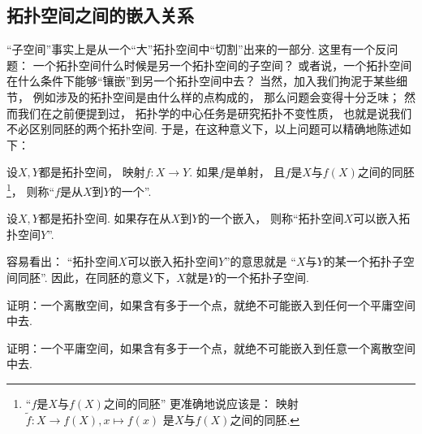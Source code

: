 \subsection{拓扑空间之间的嵌入关系}
“子空间”事实上是从一个“大”拓扑空间中“切割”出来的一部分.
这里有一个反问题：
一个拓扑空间什么时候是另一个拓扑空间的子空间？
或者说，一个拓扑空间在什么条件下能够“镶嵌”到另一个拓扑空间中去？
当然，加入我们拘泥于某些细节，
例如涉及的拓扑空间是由什么样的点构成的，
那么问题会变得十分乏味；
然而我们在之前便提到过，
拓扑学的中心任务是研究拓扑不变性质，
也就是说我们不必区别同胚的两个拓扑空间.
于是，在这种意义下，以上问题可以精确地陈述如下：
\begin{definition}
设\(X,Y\)都是拓扑空间，
映射\(f\colon X \to Y\).
如果\(f\)是单射，
且\(f\)是\(X\)与\(f(X)\)之间的同胚\footnote{
	“\(f\)是\(X\)与\(f(X)\)之间的同胚”
	更准确地说应该是：
	映射\(\tilde{f}\colon X \to f(X), x \mapsto f(x)\)
	是\(X\)与\(f(X)\)之间的同胚.
}，
则称“\(f\)是从\(X\)到\(Y\)的一个”.
\end{definition}
\begin{definition}
设\(X,Y\)都是拓扑空间.
如果存在从\(X\)到\(Y\)的一个嵌入，
则称“拓扑空间\(X\)可以嵌入拓扑空间\(Y\)”.
\end{definition}
\begin{remark}
容易看出：
“拓扑空间\(X\)可以嵌入拓扑空间\(Y\)”的意思就是
“\(X\)与\(Y\)的某一个拓扑子空间同胚”.
因此，在同胚的意义下，\(X\)就是\(Y\)的一个拓扑子空间.
\end{remark}

\begin{example}
证明：一个离散空间，如果含有多于一个点，就绝不可能嵌入到任何一个平庸空间中去.
\end{example}

\begin{example}
证明：一个平庸空间，如果含有多于一个点，就绝不可能嵌入到任意一个离散空间中去.
\end{example}

